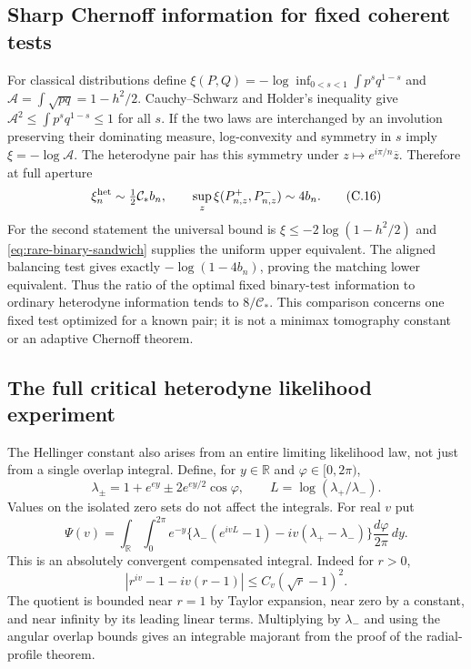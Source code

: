 \subsection{Sharp Chernoff information for fixed coherent tests}
For classical distributions define
$\xi(P,Q)=-\log\inf_{0<s<1}\int p^s q^{1-s}$ and
$\mathcal A=\int\sqrt{pq}=1-h^2/2$.
Cauchy--Schwarz and Holder's inequality give
$\mathcal A^2\le\int p^s q^{1-s}\le1$ for all $s$.
If the two laws are interchanged by an involution preserving their dominating
measure, log-convexity and symmetry in $s$ imply
$\xi=-\log\mathcal A$.
The heterodyne pair has this symmetry under $z\mapsto e^{i\pi/n}\overline z$.
Therefore at full aperture
\[
 \xi_{n}^{\rm het}\sim\tfrac12\mathcal C_*b_n,
 \qquad
 \sup_z\xi(P_{n,z}^+,P_{n,z}^-)\sim4b_n.
 \tag{C.16}\label{eq:rare-chernoff}
\]
For the second statement the universal bound is
$\xi\le-2\log(1-h^2/2)$ and
\eqref{eq:rare-binary-sandwich} supplies the uniform upper equivalent.
The aligned balancing test gives exactly $-\log(1-4b_n)$, proving the
matching lower equivalent. Thus the ratio of the optimal fixed binary-test
information to ordinary heterodyne information tends to $8/\mathcal C_*$.
This comparison concerns one fixed test optimized for a known pair; it is
not a minimax tomography constant or an adaptive Chernoff theorem.

\subsection{The full critical heterodyne likelihood experiment}
The Hellinger constant also arises from an entire limiting likelihood law,
not just from a single overlap integral. Define, for $y\in\mathbb R$ and
$\varphi\in[0,2\pi)$,
\[
 \lambda_\pm=1+e^{ey}\pm2e^{ey/2}\cos\varphi,
 \qquad L=\log(\lambda_+/\lambda_-).
\]
Values on the isolated zero sets do not affect the integrals. For real $v$ put
\[
 \Psi(v)=\int_{\mathbb R}\int_0^{2\pi}e^{-y}
 \{\lambda_-(e^{ivL}-1)-iv(\lambda_+-\lambda_-)\}
                    \frac{d\varphi}{2\pi}\,dy.
 \tag{C.17}\label{eq:rare-likelihood-exponent}
\]
This is an absolutely convergent compensated integral. Indeed for $r>0$,
\[
 |r^{iv}-1-iv(r-1)|\le C_v(\sqrt r-1)^2.
\]
The quotient is bounded near $r=1$ by Taylor expansion, near zero by a
constant, and near infinity by its leading linear terms. Multiplying by
$\lambda_-$ and using the angular overlap bounds gives an integrable
majorant from the proof of the radial-profile theorem.

